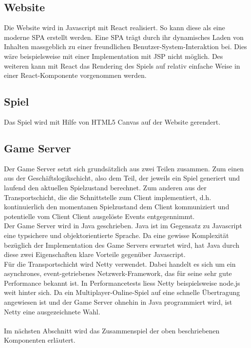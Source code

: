 \documentclass[11pt,ngerman]{article}
\begin{document}
        \subsection{Website}
        Die Website wird in Javascript mit React realisiert. So kann diese als eine moderne \Gls{SPA} erstellt werden. Eine \Gls{SPA} trägt durch ihr dynamisches Laden von Inhalten massgeblich zu einer freundlichen Benutzer-System-Interaktion bei. Dies wäre beispielsweise mit einer Implementation mit \Gls{JSP} nicht möglich. Des weiteren kann mit React das Rendering des Spiels auf relativ einfache Weise in einer React-Komponente vorgenommen werden.
        
        \subsection{Spiel}
        Das Spiel wird mit Hilfe von \Gls{HTML5 Canvas} auf der Website gerendert.

        \label{SoftwarearchitekturGameServer}
        \subsection{\Gls{Game Server}}
        Der \Gls{Game Server} setzt sich grundsätzlich aus zwei Teilen zusammen. Zum einen aus der Geschäftslogikschicht, also dem Teil, der jeweils ein Spiel generiert und laufend den aktuellen Spielzustand berechnet. Zum anderen aus der Transportschicht, die die Schnittstelle zum Client implementiert, d.h. kontinuierlich den momentanen Spielzustand dem Client kommuniziert und potentielle vom Client Client ausgelöste Events entgegennimmt.\\
        Der \Gls{Game Server} wird in Java geschrieben. Java ist im Gegensatz zu Javascript eine typsichere und objektorientierte Sprache. Da eine gewisse Komplexität bezüglich der Implementation des \Gls{Game Server}s erwartet wird, hat Java durch diese zwei Eigenschaften klare Vorteile gegenüber Javascript.\\
        Für die Transportschicht wird Netty verwendet. Dabei handelt es sich um ein asynchrones, event-getriebenes Netzwerk-Framework, das für seine sehr gute Performance bekannt ist. In Performancetests liess Netty beispielsweise node.js weit hinter sich.\cite{NettyPerformancetests} Da ein Multiplayer-Online-Spiel auf eine schnelle Übertragung angewiesen ist und der \Gls{Game Server} ohnehin in Java programmiert wird, ist Netty eine ausgezeichnete Wahl.\\
        \\
        Im nächsten Abschnitt wird das Zusammenspiel der oben beschriebenen Komponenten erläutert.
\end{document}
